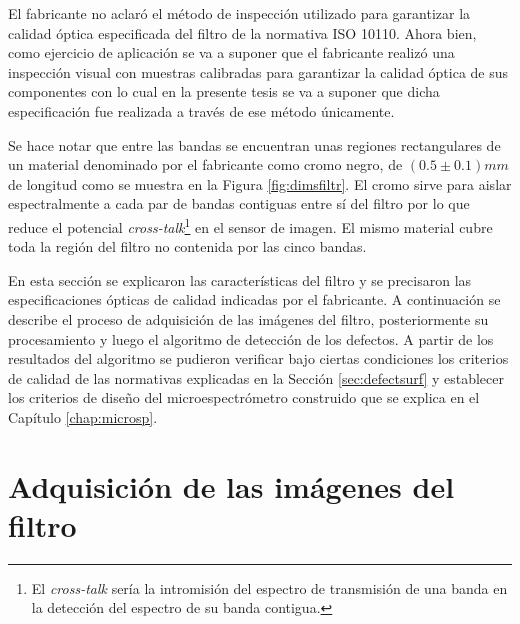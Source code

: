 El fabricante no aclaró el método de inspección utilizado para garantizar la calidad óptica especificada del filtro de la normativa ISO 10110. Ahora bien, como ejercicio de aplicación se va a suponer que el fabricante realizó una inspección visual con muestras calibradas para garantizar la calidad óptica de sus componentes con lo cual en la presente tesis se va a suponer que dicha especificación fue realizada a través de ese método únicamente.

Se hace notar que entre las bandas se encuentran unas regiones rectangulares de un material denominado por el fabricante como cromo negro, de $(0.5 \pm 0.1)mm $ de longitud como se muestra en la Figura \ref{fig:dimsfiltr}. El cromo sirve para aislar espectralmente a cada par de bandas contiguas entre sí del filtro por lo que reduce el potencial \textit{cross-talk}\footnote{El \textit{cross-talk} sería la intromisión del espectro de transmisión de una banda en la detección del espectro de su banda contigua.} en el sensor de imagen. El mismo material cubre toda la región del filtro no contenida por las cinco bandas. 

En esta sección se explicaron las características del filtro y se precisaron las especificaciones ópticas de calidad indicadas por el fabricante. A continuación se describe el proceso de adquisición de las imágenes del filtro, posteriormente su procesamiento y luego el algoritmo de detección de los defectos. A partir de los resultados del algoritmo se pudieron verificar bajo ciertas condiciones los criterios de calidad de las normativas explicadas en la Sección \ref{sec:defectsurf} y establecer los criterios de diseño del microespectrómetro construido que se explica en el Capítulo \ref{chap:microsp}.

\singlespacing
\section{Adquisición de las imágenes del filtro}
\label{sec:conf}

